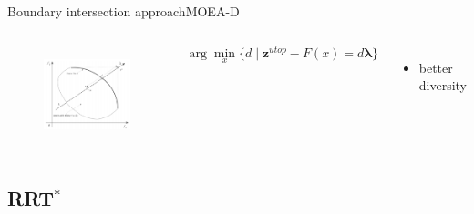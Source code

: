 \begin{frame}{Boundary intersection approach}{MOEA-D}
	\begin{columns}
		\begin{figure}
			\centering
			\includegraphics[width=\linewidth]{figure/boundary_intersection}
			\label{fig:boundary_intersection}
		\end{figure}
		\begin{minipage}{\textwidth}
			\begin{equation}
			\nonumber
			\arg \min_x \{ d \mid \bm{z}^{utop} - F(x) = d \bm{\lambda} \}
			\end{equation}
			\begin{itemize}
				\item better diversity
			\end{itemize}
		\end{minipage}
	\end{columns}
\end{frame}

\subsection{RRT$^{*}$}

